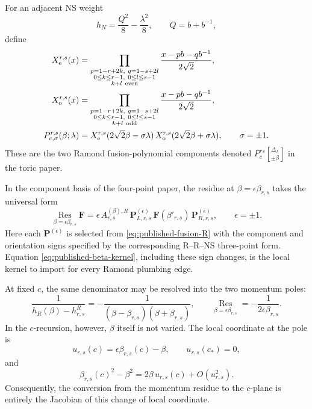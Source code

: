 \documentclass[11pt]{article}
\newcommand{\Res}{\operatorname*{Res}}
\begin{document}
For an adjacent NS weight
\begin{equation}
 h_N=\frac{Q^2}{8}-\frac{\lambda^2}{8},
 \qquad Q=b+b^{-1},
\end{equation}
define
\begin{align}
 X^{r,s}_{\rm e}(x)
 &=
 \prod_{\substack{p=1-r+2k,\ q=1-s+2l\\
                   0\leq k\leq r-1,\ 0\leq l\leq s-1\\
                   k+l\ {\rm even}}}
 \frac{x-pb-qb^{-1}}{2\sqrt2},
 \notag\\
 X^{r,s}_{\rm o}(x)
 &=
 \prod_{\substack{p=1-r+2k,\ q=1-s+2l\\
                   0\leq k\leq r-1,\ 0\leq l\leq s-1\\
                   k+l\ {\rm odd}}}
 \frac{x-pb-qb^{-1}}{2\sqrt2},
 \label{eq:published-Xeo-R}\\
 P^{r,s}_{c,\sigma}(\beta;\lambda)
 &=
 X^{r,s}_{\rm e}(2\sqrt2\beta-\sigma\lambda)\,
 X^{r,s}_{\rm o}(2\sqrt2\beta+\sigma\lambda),
 \qquad \sigma=\pm1.
 \label{eq:published-fusion-R}
\end{align}
These are the two Ramond fusion-polynomial components denoted
\(P^{rs}_c[{}^{\Delta_\lambda}_{\pm\beta}]\) in the toric paper.

In the component basis of the four-point paper, the residue at
\(\beta=\epsilon\beta_{r,s}\) takes the universal form
\begin{equation}
 \Res_{\beta=\epsilon\beta_{r,s}}
 \mathbf F
 =
 \epsilon\,A^{(\beta),R}_{r,s}\,
 \mathbf P^{(\epsilon)}_{L,r,s}\,
 \mathbf F(\beta'_{r,s})\,
 \mathbf P^{(\epsilon)}_{R,r,s},
 \qquad \epsilon=\pm1.
 \label{eq:published-beta-kernel}
\end{equation}
Here each \(\mathbf P^{(\epsilon)}\) is selected from
\eqref{eq:published-fusion-R} with the component and orientation signs
specified by the corresponding R--R--NS three-point form.  Equation
\eqref{eq:published-beta-kernel}, including these sign changes, is the
local kernel to import for every Ramond plumbing edge.

At fixed \(c\), the same denominator may be resolved into the two momentum
poles:
\begin{equation}
 \frac{1}{h_R(\beta)-h^R_{r,s}}
 =
 -\frac{1}{(\beta-\beta_{r,s})(\beta+\beta_{r,s})},
 \qquad
 \Res_{\beta=\epsilon\beta_{r,s}}
 =
 -\frac{1}{2\epsilon\beta_{r,s}}.
 \label{eq:fixed-beta-beta-residue}
\end{equation}
In the \(c\)-recursion, however, \(\beta\) itself is not varied.  The local
coordinate at the pole is
\begin{equation}
 u_{r,s}(c)=\epsilon\beta_{r,s}(c)-\beta,
 \qquad
 u_{r,s}(c_*)=0,
 \label{eq:fixed-beta-local-coordinate}
\end{equation}
and
\begin{equation}
 \beta_{r,s}(c)^2-\beta^2
 =
 2\beta\,u_{r,s}(c)+O(u_{r,s}^2).
 \label{eq:fixed-beta-pullback}
\end{equation}
Consequently, the conversion from the momentum residue to the \(c\)-plane
is entirely the Jacobian of this change of local coordinate.
\end{document}
